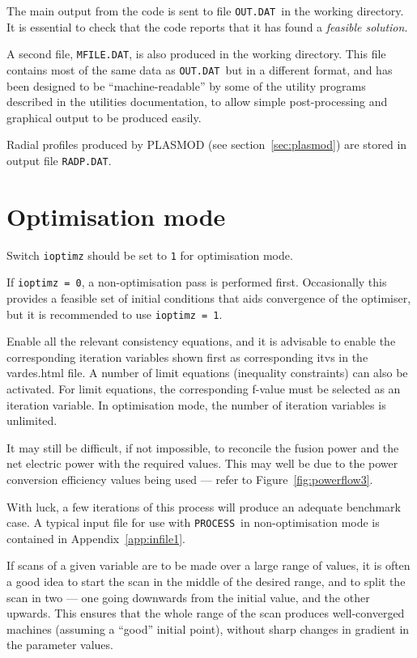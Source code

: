 \documentclass[11pt,a4paper]{report}
\newcommand{\mfile}{\mbox{\texttt{MFILE.DAT}}}
\newcommand{\outdat}{\mbox{\texttt{OUT.DAT}}}
\newcommand{\radpdat}{\mbox{\texttt{RADP.DAT}}}
\newcommand{\process}{\mbox{\texttt{PROCESS}}}
\begin{document}
The main output from the code is sent to file \outdat\ in the working
directory.  It is essential to check that the code reports that it has found a
\textit{feasible solution}.

A second file, \mfile, is also produced in the working directory.  This file
contains most of the same data as \outdat\ but in a different format, and has
been designed to be ``machine-readable'' by some of the utility programs
described in the utilities documentation, to allow simple post-processing and
graphical output to be produced easily.

Radial profiles produced by PLASMOD (see section~\ref{sec:plasmod}) are stored in
output file \radpdat. 

\section{Optimisation mode}

Switch \texttt{ioptimz} should be set to \texttt{1} for optimisation mode.

If \texttt{ioptimz = 0}, a non-optimisation pass is performed first.  Occasionally this provides a feasible set of initial conditions that aids convergence of the optimiser, but it is recommended to use \texttt{ioptimz = 1}.

Enable all the relevant consistency equations, and it is advisable to enable the corresponding iteration variables shown first as corresponding itvs in the vardes.html file. A number of limit equations (inequality constraints) can also be activated.  For limit equations, the corresponding f-value must be selected as an iteration variable.  In optimisation mode, the number of iteration variables is unlimited.

It may still be difficult, if not impossible, to reconcile the fusion power
and the net electric power with the required values. This may well be due to
the power conversion efficiency values being used --- refer to
Figure~\ref{fig:powerflow3}.

With luck, a few iterations of this process will produce an adequate benchmark
case. A typical input file for use with \process\ in non-optimisation mode is
contained in Appendix~\ref{app:infile1}.

If scans of a given variable are to be made over a large range of
values, it is often a good idea to start the scan in the middle of the desired
range, and to split the scan in two --- one going downwards from the initial
value, and the other upwards.  This ensures that the whole range of the scan
produces well-converged machines (assuming a ``good'' initial point), without
sharp changes in gradient in the parameter values.
\end{document}
